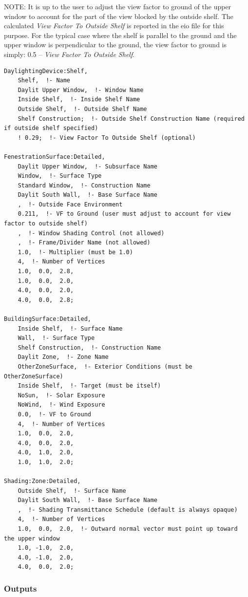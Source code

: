 \begin{callout}
  NOTE: It is up to the user to adjust the view factor to ground of the upper window to account for the part of the view blocked by the outside shelf. The calculated \emph{View Factor To Outside Shelf} is reported in the eio file for this purpose. For the typical case where the shelf is parallel to the ground and the upper window is perpendicular to the ground, the view factor to ground is simply: 0.5 -- \emph{View Factor To Outside Shelf}.
\end{callout}

\begin{lstlisting}
DaylightingDevice:Shelf,
    Shelf,  !- Name
    Daylit Upper Window,  !- Window Name
    Inside Shelf,  !- Inside Shelf Name
    Outside Shelf,  !- Outside Shelf Name
    Shelf Construction;  !- Outside Shelf Construction Name (required if outside shelf specified)
    ! 0.29;  !- View Factor To Outside Shelf (optional)

FenestrationSurface:Detailed,
    Daylit Upper Window,  !- Subsurface Name
    Window,  !- Surface Type
    Standard Window,  !- Construction Name
    Daylit South Wall,  !- Base Surface Name
    ,  !- Outside Face Environment
    0.211,  !- VF to Ground (user must adjust to account for view factor to outside shelf)
    ,  !- Window Shading Control (not allowed)
    ,  !- Frame/Divider Name (not allowed)
    1.0,  !- Multiplier (must be 1.0)
    4,  !- Number of Vertices
    1.0,  0.0,  2.8,
    1.0,  0.0,  2.0,
    4.0,  0.0,  2.0,
    4.0,  0.0,  2.8;

BuildingSurface:Detailed,
    Inside Shelf,  !- Surface Name
    Wall,  !- Surface Type
    Shelf Construction,  !- Construction Name
    Daylit Zone,  !- Zone Name
    OtherZoneSurface,  !- Exterior Conditions (must be OtherZoneSurface)
    Inside Shelf,  !- Target (must be itself)
    NoSun,  !- Solar Exposure
    NoWind,  !- Wind Exposure
    0.0,  !- VF to Ground
    4,  !- Number of Vertices
    1.0,  0.0,  2.0,
    4.0,  0.0,  2.0,
    4.0,  1.0,  2.0,
    1.0,  1.0,  2.0;

Shading:Zone:Detailed,
    Outside Shelf,  !- Surface Name
    Daylit South Wall,  !- Base Surface Name
    ,  !- Shading Transmittance Schedule (default is always opaque)
    4,  !- Number of Vertices
    1.0,  0.0,  2.0,  !- Outward normal vector must point up toward the upper window
    1.0, -1.0,  2.0,
    4.0, -1.0,  2.0,
    4.0,  0.0,  2.0;
\end{lstlisting}

\subsubsection{Outputs}\label{outputs-3-002}


